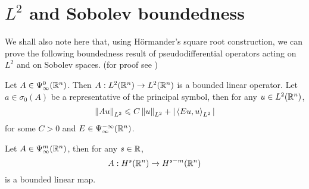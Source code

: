 \documentclass[12pt]{article}
\begin{document}
\section{$L^2$ and Sobolev boundedness} 
We shall also note here that, using H\"ormander's square root construction, we can prove the following boundedness result of pseudodifferential operators acting on $L^2$ and on Sobolev spaces. (for proof see \cite{rbm_intro_microlocal,Vasy2015-oo})

\begin{fprop}
    Let $A \in \Psi^{0}_{\infty}(\R^n)$. Then $A : L^2(\R^n) \to L^2(\R^n)$ is a bounded linear operator. Let $a \in \sigma_0(A)$ be a representative of the principal symbol, then for any $u \in L^2(\R^n)$, 
    \begin{align*}
    \norm[A u ]_{L^2} \leq C \norm[u]_{L^2} + \abs{\inprod[Eu, u]_{L^2}}
    \end{align*}
    for some $C > 0$ and $E \in \Psi^{-\infty}_{\infty}(\R^n)$. 
\end{fprop}

\begin{fprop}
    Let $A \in \Psi^{m}_{\infty}(\R^n)$, then for any $s \in \R$, $$A : H^{s}(\R^n) \to H^{s - m}(\R^n)$$ is a bounded linear map. 
\end{fprop}
\end{document}
